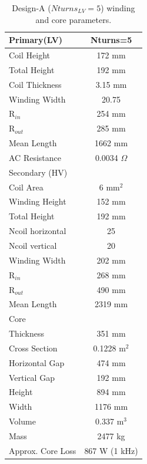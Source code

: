 \documentclass[a4paper, 11pt]{article} %
\begin{document}
\begin{table}[]
\begin{center}
\begin{tabular}{lc}
Primary(LV) & Nturns=5\\
\hline
Coil Height & 172 mm \\
Total Height & 192 mm \\
Coil Thickness & 3.15 mm\\
Winding Width & 20.75 \\
R$_{in}$ & 254 mm \\
R$_{out}$ & 285 mm \\
Mean Length & 1662 mm \\
AC Resistance & 0.0034 $\Omega$ \\
\hline
Secondary (HV) \\
Coil Area & 6 mm$^2$\\
Winding Height & 152 mm \\ 
Total Height & 192 mm \\
Ncoil horizontal & 25 \\
Ncoil vertical & 20 \\
Winding Width & 202 mm \\
R$_{in}$ & 268 mm \\
R$_{out}$ & 490 mm \\
Mean Length & 2319 mm \\
\hline
Core \\
Thickness & 351 mm \\
Cross Section & 0.1228 m$^2$\\
Horizontal Gap & 474 mm \\
Vertical Gap & 192 mm \\
Height & 894 mm \\
Width & 1176 mm \\
Volume & 0.337 m$^3$ \\
Mass & 2477 kg \\
\hline
Approx. Core Loss & 867 W (1 kHz) \\
\hline
\end{tabular} 
\end{center}
\caption{Design-A ($Nturns_{LV}=5$) winding and core parameters.}
\label{design_A}
\end{table}
\end{document}
